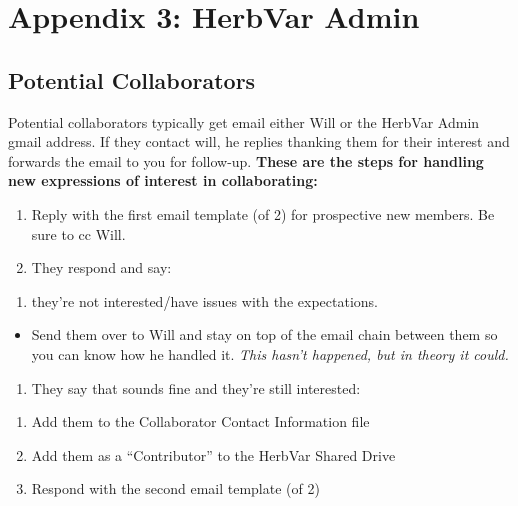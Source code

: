 \documentclass[
  letterpaper,
  oneside,
  open=any]{scrbook}
\providecommand{\tightlist}{%
  \setlength{\itemsep}{0pt}\setlength{\parskip}{0pt}}\usepackage{longtable,booktabs,array}
\begin{document}
\part{Appendix 3: HerbVar Admin}

\chapter{Potential Collaborators}\label{potential-collaborators}

Potential collaborators typically get email either Will or the HerbVar
Admin gmail address. If they contact will, he replies thanking them for
their interest and forwards the email to you for follow-up.
\textbf{These are the steps for handling new expressions of interest in
collaborating:}

\begin{enumerate}
\def\labelenumi{\arabic{enumi}.}
\item
  Reply with the first email template (of 2) for prospective new
  members. Be sure to cc Will.
\item
  They respond and say:
\end{enumerate}

\begin{enumerate}
\def\labelenumi{\alph{enumi})}
\tightlist
\item
  they're not interested/have issues with the expectations.
\end{enumerate}

\begin{itemize}
\tightlist
\item
  Send them over to Will and stay on top of the email chain between them
  so you can know how he handled it. \emph{This hasn't happened, but in
  theory it could.}
\end{itemize}

\begin{enumerate}
\def\labelenumi{\alph{enumi})}
\setcounter{enumi}{1}
\tightlist
\item
  They say that sounds fine and they're still interested:
\end{enumerate}

\begin{enumerate}
\def\labelenumi{\roman{enumi}.}
\item
  Add them to the Collaborator Contact Information file
\item
  Add them as a ``Contributor'' to the HerbVar Shared Drive
\item
  Respond with the second email template (of 2)
\end{enumerate}
\end{document}
